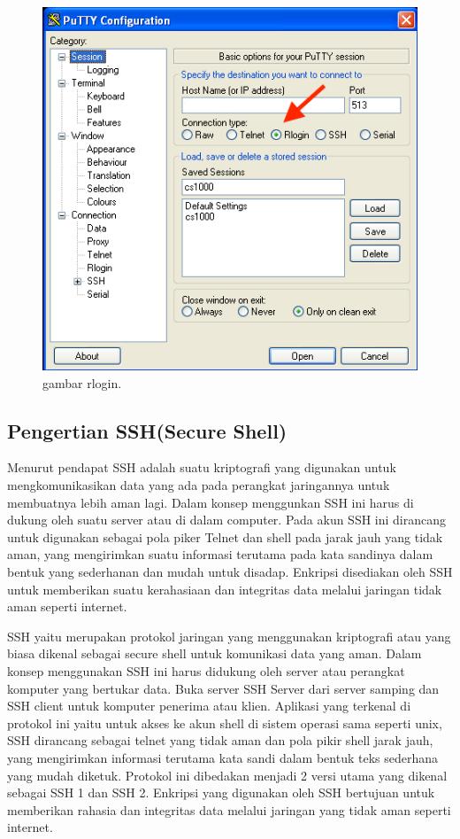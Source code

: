 \begin{figure}[ht]
\centerline{\includegraphics[width=1\textwidth]{figures/rlogin.png}}
\caption{gambar rlogin.}
\label{rlogin}
\end{figure}


\subsection {Pengertian SSH(Secure Shell)}

Menurut pendapat \cite{Jusuf.Heni2015Penggunaan Secure Shell} SSH adalah suatu kriptografi yang digunakan untuk mengkomunikasikan data yang ada pada perangkat jaringannya untuk membuatnya lebih aman lagi. Dalam konsep menggunkan SSH ini harus di dukung oleh suatu server atau di dalam computer. Pada akun SSH ini dirancang untuk digunakan sebagai pola piker Telnet dan shell pada jarak jauh yang tidak aman, yang mengirimkan suatu informasi terutama pada kata sandinya dalam bentuk yang sederhanan dan mudah untuk disadap. Enkripsi disediakan oleh SSH untuk memberikan suatu kerahasiaan dan integritas data melalui jaringan tidak aman seperti internet.

SSH yaitu merupakan protokol jaringan yang menggunakan kriptografi atau yang biasa dikenal sebagai secure shell untuk komunikasi data yang aman. Dalam konsep menggunakan SSH ini harus didukung oleh server atau perangkat komputer yang bertukar data. Buka server SSH Server dari server samping dan SSH client untuk komputer penerima atau klien.
Aplikasi yang terkenal di protokol ini yaitu untuk akses ke akun shell di sistem operasi sama seperti unix, SSH dirancang sebagai telnet yang tidak aman dan pola pikir shell jarak jauh, yang mengirimkan informasi terutama kata sandi dalam bentuk teks sederhana yang mudah diketuk. Protokol ini dibedakan menjadi 2 versi utama yang dikenal sebagai SSH 1 dan SSH 2. Enkripsi yang digunakan oleh SSH bertujuan untuk memberikan rahasia dan integritas data melalui jaringan yang tidak aman seperti internet. 


